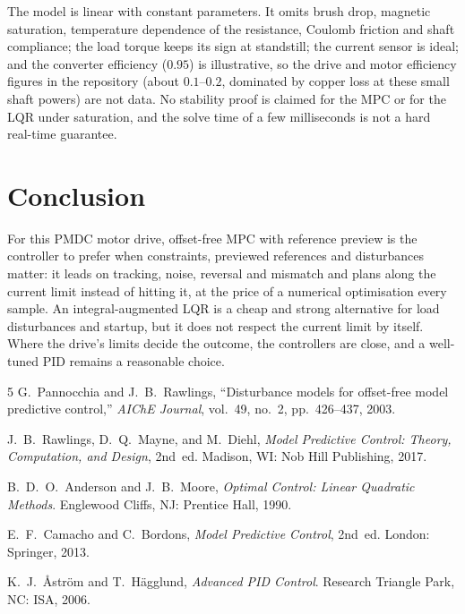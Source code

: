 \documentclass[11pt,a4paper]{article}
\begin{document}
The model is linear with constant parameters.
It omits brush drop, magnetic saturation, temperature dependence of the resistance, Coulomb friction and shaft compliance; the load torque keeps its sign at standstill; the current sensor is ideal; and the converter efficiency (\(0.95\)) is illustrative, so the drive and motor efficiency figures in the repository (about \(0.1\)--\(0.2\), dominated by copper loss at these small shaft powers) are not data.
No stability proof is claimed for the MPC or for the LQR under saturation, and the solve time of a few milliseconds is not a hard real-time guarantee.

\section{Conclusion}
For this PMDC motor drive, offset-free MPC with reference preview is the controller to prefer when constraints, previewed references and disturbances matter: it leads on tracking, noise, reversal and mismatch and plans along the current limit instead of hitting it, at the price of a numerical optimisation every sample.
An integral-augmented LQR is a cheap and strong alternative for load disturbances and startup, but it does not respect the current limit by itself.
Where the drive's limits decide the outcome, the controllers are close, and a well-tuned PID remains a reasonable choice.

\begin{thebibliography}{5}
\footnotesize
{}
G.~Pannocchia and J.~B.~Rawlings,
``Disturbance models for offset-free model predictive control,''
\emph{AIChE Journal}, vol.~49, no.~2, pp.~426--437, 2003.

J.~B.~Rawlings, D.~Q.~Mayne, and M.~Diehl,
\emph{Model Predictive Control: Theory, Computation, and Design}, 2nd~ed.
Madison, WI: Nob Hill Publishing, 2017.

B.~D.~O.~Anderson and J.~B.~Moore,
\emph{Optimal Control: Linear Quadratic Methods}.
Englewood Cliffs, NJ: Prentice Hall, 1990.

E.~F.~Camacho and C.~Bordons,
\emph{Model Predictive Control}, 2nd~ed.
London: Springer, 2013.

K.~J.~\r{A}str\"om and T.~H\"agglund,
\emph{Advanced PID Control}.
Research Triangle Park, NC: ISA, 2006.
\end{thebibliography}
\end{document}
